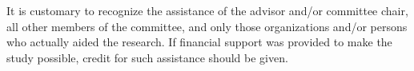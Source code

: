 \documentclass[ms]{uncgdissertationexp}
\theoremstyle{plain}
\theoremstyle{definition}
\theoremstyle{remark}
\begin{document}
\begin{acknowledgments}
  It is customary to recognize the assistance of the advisor and/or
  committee chair, all other members of the committee, and only those
  organizations and/or persons who actually aided the research. If
  financial support was provided to make the study possible, credit for
  such assistance should be given.
\end{acknowledgments}


\tableofcontents


  \listoftables
  


  \listoffigures
  

\mainmatter %
 
\end{document}

